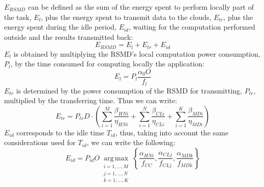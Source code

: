 \documentclass[twoside,openright]{report}
\begin{document}
$E_\textit{RSMD}$  can be defined as the sum of the energy spent to perform locally part of the task, $E_\textit{l}$, plus the energy spent to transmit data to the clouds, $E_\textit{tr}$, plus the energy spent during the idle period, $E_\textit{id}$, waiting for the computation performed outside and the results transmitted back: 
\begin{equation}
\label{eq:energyRSMD}
E_\textit{RSMD} = E_\textit{l} + E_\textit{tr} +  E_\textit{id} 
\end{equation}
$E_\textit{l}$ is obtained by multiplying the \gls{RSMD}'s local computation power consumption,  $P_l$, by the time consumed for computing locally the application:
\begin{equation}
\label{eq:El}
E_\textit{l}= P_l  \frac{\alpha_0 O }{f_l} 
\end{equation}
$E_\textit{tr}$ is determined by the power consumption of the \gls{RSMD} for transmitting, $P_\textit{tr}$, multiplied by the transferring time. Thus we can write:
\begin{equation}
\label{eq:Etr}
E_\textit{tr} = P_\textit{tr} D  \cdot \left (  \sum_{i=1}^\textit{M}\frac{\beta_\textit{HNi}}{\eta_\textit{HNi}}  + \sum_{i=1}^\textit{N}\frac{\beta_\textit{CLi}}{\eta_\textit{CLi}}+ \sum_{i=1}^\textit{K}\frac{\beta_\textit{MDi}}{\eta_\textit{MDi}} \right )
\end{equation}
$E_\textit{id}$ corresponds to the idle time $T_\textit{id}$, thus, taking into account the same considerations used for $T_\textit{id}$, we can write the following:
\begin{equation}
\label{eq:Eid}
E_\textit{id} = P_\textit{id} O \operatorname*{arg\,max}_{\substack{i=1,\ldots,M\\ j=1,\ldots,N\\ k=1,\ldots,K}} \left \{  \frac{\alpha_\textit{HNi}}{f_\textit{CC}} ,  \frac{\alpha_\textit{CLj}}{f_\textit{CLj}} ,   \frac{\alpha_\textit{MDk}}{f_\textit{MDk}} \right \}
\end{equation}
\end{document}
